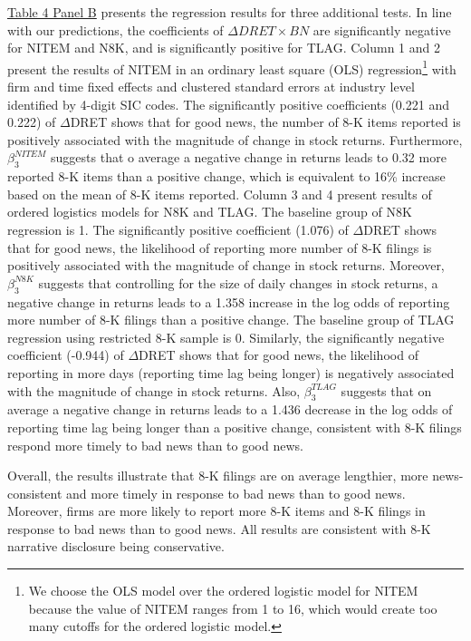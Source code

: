 \documentclass[letterpaper,11pt]{article}
\begin{document}
\begin{spacing}{1.5}
\hyperref[T4PB]{Table 4 Panel B} presents the regression results for three additional tests. In line with our predictions, the coefficients of $\Delta DRET\times BN$ are significantly negative for NITEM and N8K, and is significantly positive for TLAG. Column 1 and 2 present the results of NITEM in an ordinary least square (OLS) regression\footnote{We choose the OLS model over the ordered logistic model for NITEM because the value of NITEM ranges from 1 to 16, which would create too many cutoffs for the ordered logistic model.} with firm and time fixed effects and clustered standard errors at industry level identified by 4-digit SIC codes. The significantly positive coefficients (0.221 and 0.222) of $\Delta$DRET shows that for good news, the number of 8-K items reported is positively associated with the magnitude of change in stock returns. Furthermore, $\beta_3^{NITEM}$ suggests that o average a negative change in returns leads to 0.32 more reported 8-K items than a positive change, which is equivalent to 16\% increase based on the mean of 8-K items reported. Column 3 and 4 present results of ordered logistics models for N8K and TLAG. The baseline group of N8K regression is 1. The significantly positive coefficient (1.076) of $\Delta$DRET shows that for good news, the likelihood of reporting more number of 8-K filings is positively associated with the magnitude of change in stock returns. Moreover, $\beta_3^{N8K}$ suggests that controlling for the size of daily changes in stock returns, a negative change in returns leads to a 1.358 increase in the log odds of reporting more number of 8-K filings than a positive change. The baseline group of TLAG regression using restricted 8-K sample is 0. Similarly, the significantly negative coefficient (-0.944) of $\Delta$DRET shows that for good news, the likelihood of reporting in more days (reporting time lag being longer) is negatively associated with the magnitude of change in stock returns. Also, $\beta_3^{TLAG}$ suggests that on average a negative change in returns leads to a 1.436 decrease in the log odds of reporting time lag being longer than a positive change, consistent with 8-K filings respond more timely to bad news than to good news. 

Overall, the results illustrate that 8-K filings are on average lengthier, more news-consistent and more timely in response to bad news than to good news. Moreover, firms are more likely to report more 8-K items and 8-K filings in response to bad news than to good news. All results are consistent with 8-K narrative disclosure being conservative.


\end{spacing}
\end{document}
